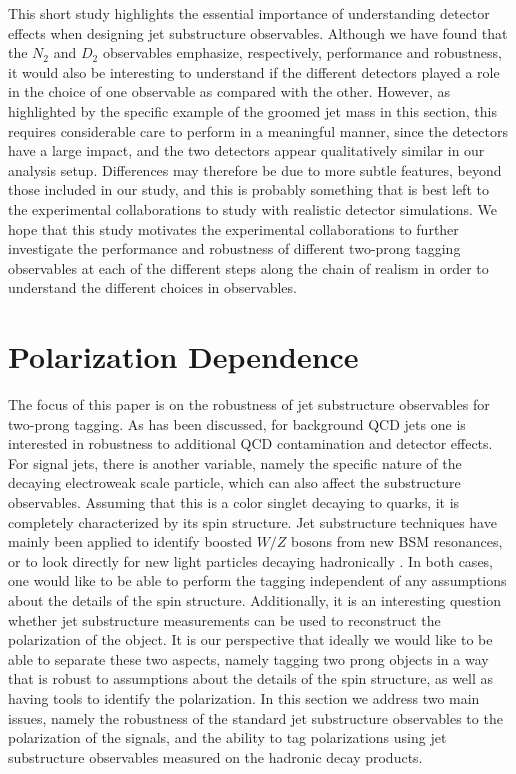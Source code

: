 \documentclass[11pt,letterpaper]{article}
\begin{document}
This short study highlights the essential importance of understanding detector effects when designing jet substructure observables. Although we have found that the $N_2$ and $D_2$ observables emphasize, respectively, performance and robustness, it would also be interesting to understand if the different detectors played a role in the choice of one observable as compared with the other. However, as highlighted by the specific example of the groomed jet mass in this section, this requires considerable care to perform in a meaningful manner, since the detectors have a large impact, and the two detectors appear qualitatively similar in our analysis setup. Differences may therefore be due to more subtle features, beyond those included in our study, and this is probably something that is best left to the experimental collaborations to study with realistic detector simulations. We hope that this study motivates the experimental collaborations to further investigate the performance and robustness of different two-prong tagging observables at each of the different steps along the chain of realism in order to understand the different choices in observables.







\section{Polarization Dependence}\label{sec:polar}




The focus of this paper is on the robustness of jet substructure
observables for two-prong tagging.
%
As has been discussed, for
background QCD jets one is interested in robustness to additional QCD
contamination and detector effects. For signal jets, there is another variable, namely the specific nature of the decaying electroweak scale particle, which can also affect the substructure observables.
%
Assuming
that this is a color singlet decaying to quarks, it is completely
characterized by its spin structure.
%
Jet substructure techniques have
mainly been applied to identify boosted $W/Z$ bosons from new BSM
resonances, or to look directly for new light particles decaying
hadronically \cite{CMS-PAS-EXO-17-001}.
%
In both cases, one would like
to be able to perform the tagging independent of any assumptions about
the details of the spin structure.
%
Additionally, it is an interesting
question whether jet substructure measurements can be used to
reconstruct the polarization of the object.
%
It is our perspective that
ideally we would like to be able to separate these two aspects, namely
tagging two prong objects in a way that is robust to assumptions about
the details of the spin structure, as well as having tools to identify
the polarization.
%
In this section we address two main issues, namely
the robustness of the standard jet substructure observables to the
polarization of the signals, and the ability to tag polarizations
using jet substructure observables measured on the hadronic decay
products.
\end{document}
